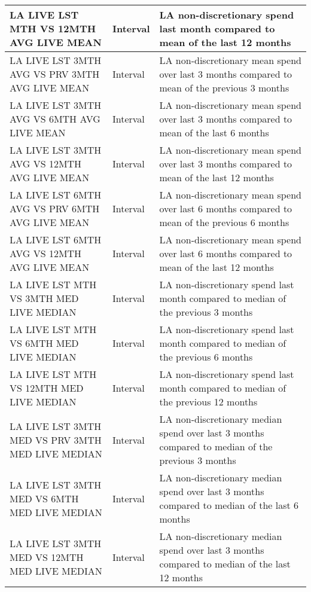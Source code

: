 \begin{longtable}{|p{5.5cm}|l|p{6.5cm}|}
	LA LIVE LST MTH VS 12MTH AVG LIVE MEAN              & Interval           & LA non-discretionary spend last month compared to mean of the last 12 months                     \\ \hline
	LA LIVE LST 3MTH AVG VS PRV 3MTH AVG LIVE MEAN    & Interval           & LA non-discretionary mean spend over last 3 months compared to mean of the previous 3 months     \\ \hline
	LA LIVE LST 3MTH AVG VS 6MTH AVG LIVE MEAN         & Interval           & LA non-discretionary mean spend over last 3 months compared to mean of the last 6 months         \\ \hline
	LA LIVE LST 3MTH AVG VS 12MTH AVG LIVE MEAN        & Interval           & LA non-discretionary mean spend over last 3 months compared to mean of the last 12 months        \\ \hline
	LA LIVE LST 6MTH AVG VS PRV 6MTH AVG LIVE MEAN    & Interval           & LA non-discretionary mean spend over last 6 months compared to mean of the previous 6 months     \\ \hline
	LA LIVE LST 6MTH AVG VS 12MTH AVG LIVE MEAN        & Interval           & LA non-discretionary mean spend over last 6 months compared to mean of the last 12 months        \\ \hline
	LA LIVE LST MTH VS 3MTH MED LIVE MEDIAN             & Interval           & LA non-discretionary spend last month compared to median of the previous 3 months                \\ \hline
	LA LIVE LST MTH VS 6MTH MED LIVE MEDIAN             & Interval           & LA non-discretionary spend last month compared to median of the previous 6 months                \\ \hline
	LA LIVE LST MTH VS 12MTH MED LIVE MEDIAN            & Interval           & LA non-discretionary spend last month compared to median of the previous 12 months               \\ \hline
	LA LIVE LST 3MTH MED VS PRV 3MTH MED LIVE MEDIAN  & Interval           & LA non-discretionary median spend over last 3 months compared to median of the previous 3 months \\ \hline
	LA LIVE LST 3MTH MED VS 6MTH MED LIVE MEDIAN       & Interval           & LA non-discretionary median spend over last 3 months compared to median of the last 6 months     \\ \hline
	LA LIVE LST 3MTH MED VS 12MTH MED LIVE MEDIAN      & Interval           & LA non-discretionary median spend over last 3 months compared to median of the last 12 months    \\ \hline

\end{longtable}
